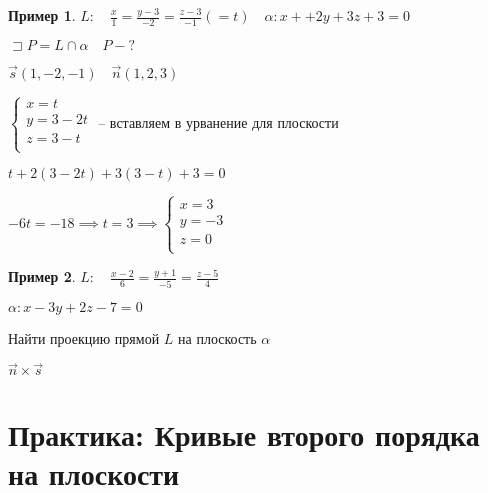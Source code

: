 \documentclass{book}
\theoremstyle{definition}
\newtheorem*{example}{Пример}
\begin{document}
\begin{example}
    $L:\quad \frac{x}{1} = \frac{y-3}{-2} = \frac{z-3}{-1} ( = t)\quad \alpha: x++2y+3z+3 = 0$ 

    $\sqsupset P = L\cap \alpha\quad P -?$

    $\vec s(1, -2, -1)\quad \vec n (1, 2, 3)$

     $\begin{cases}
         x = t\\
         y = 3-2t\\
         z = 3-t\\
     \end{cases}$ -- вставляем в урванение для плоскости

     $t + 2(3-2t)+3(3-t)+3 = 0$

     $-6t = -18 \implies t = 3 \implies \begin{cases}
         x=3\\
         y = -3\\
         z = 0\\
     \end{cases}$


\end{example}

\begin{example}
    $L:\quad \frac{x-2}{6} = \frac{y+1}{-5} = \frac{z-5}{4}$ 

    $\alpha: x-3y + 2z-7 = 0$

    Найти проекцию прямой  $L$ на плоскость  $\alpha$

     $\vec n \times \vec s$
\end{example}

\section{Практика: Кривые второго порядка на плоскости}
\end{document}
